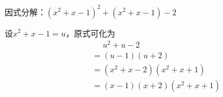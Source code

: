 \documentclass[windows,csize4]{BHCexam}
\begin{document}
\begin{groups}

    \begin{questions}[]
        \question[5]因式分解：$(x^2+x-1)^2+(x^2+x-1)-2$
        \begin{solution}{0.5cm}
            \methodonly 设$x^2+x-1=u$，原式可化为
            \[
                \begin{aligned}
                     & \phantom{=}u^2+u-2   \\
                     & =(u-1)(u+2)          \\
                     & =(x^2+x-2)(x^2+x+1)  \\
                     & =(x-1)(x+2)(x^2+x+1)
                \end{aligned}
            \]
        \end{solution}
        \vspace{4cm}


    \end{questions}
\end{groups}

\label{lastpage}
\end{document}
